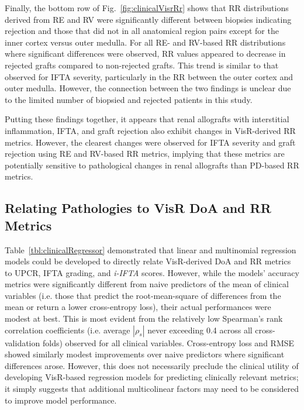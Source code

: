 Finally, the bottom row of Fig.~\ref{fig:clinicalVisrRr} shows that RR distributions derived from RE and RV were significantly different between biopsies indicating rejection and those that did not in all anatomical region pairs except for the inner cortex versus outer medulla. For all RE- and RV-based RR distributions where significant differences were observed, RR values appeared to decrease in rejected grafts compared to non-rejected grafts. This trend is similar to that observed for IFTA severity, particularly in the RR between the outer cortex and outer medulla. However, the connection between the two findings is unclear due to the limited number of biopsied and rejected patients in this study. 

Putting these findings together, it appears that renal allografts with interstitial inflammation, IFTA, and graft rejection also exhibit changes in VisR-derived RR metrics. However, the clearest changes were observed for IFTA severity and graft rejection using RE and RV-based RR metrics, implying that these metrics are potentially sensitive to pathological changes in renal allografts than PD-based RR metrics. 

\subsection{Relating Pathologies to VisR DoA and RR Metrics}

Table~\ref{tbl:clinicalRegressor} demonstrated that linear and multinomial regression models could be developed to directly relate VisR-derived DoA and RR metrics to UPCR, IFTA grading, and \emph{i-IFTA} scores. However, while the models' accuracy metrics were significantly different from naive predictors of the mean of clinical variables (i.e. those that predict the root-mean-square of differences from the mean or return a lower cross-entropy loss), their actual performances were modest at best. This is most evident from the relatively low Spearman's rank correlation coefficients (i.e. average $|\rho_{s}|$ never exceeding 0.4 across all cross-validation folds) observed for all clinical variables. Cross-entropy loss and RMSE showed similarly modest improvements over naive predictors where significant differences arose. However, this does not necessarily preclude the clinical utility of developing VisR-based regression models for predicting clinically relevant metrics; it simply suggests that additional multicolinear factors may need to be considered to improve model performance. 

